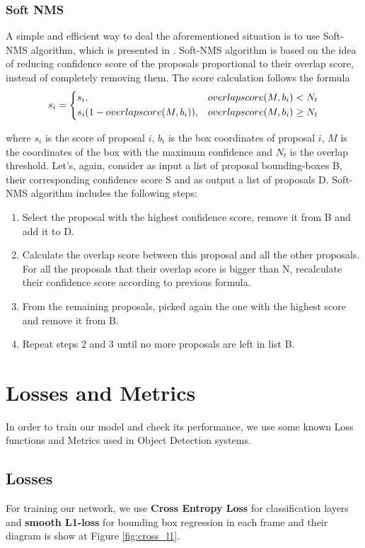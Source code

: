 \subsubsection{Soft NMS}
A simple and efficient way to deal the aforementioned situation is to use Soft-NMS algorithm, which is presented in \cite{DBLP:journals/corr/BodlaSCD17}.
Soft-NMS algorithm is based on the idea of
reducing confidence score of the proposals proportional to their overlap score, instead of completely removing them.
The score calculation follows the formula 
\[ s_i = \begin{dcases}
    s_i, & overlapscore(M, b_i) < N_t \\
    s_i(1-overlapscore(M, b_i)), & overlapscore(M, b_i) \ge N_t
    \end{dcases}
    \]

    where $s_i$ is the score of proposal $i$, $b_i$ is the box coordinates of proposal $i$, $M$ is the coordinates of
    the box with the maximum confidence and $N_t$ is the overlap threshold. Let's, again, consider as input a list of
    proposal bounding-boxes B, their corresponding confidence score S and as output a list of proposals D. Soft-NMS algorithm includes the following steps:

\begin{enumerate}
  
\item Select the proposal with the highest confidence score, remove it from B and add it to D.
\item Calculate the overlap score between this proposal and all the other proposals. For all the proposals that their overlap
  score is bigger than N, recalculate their confidence score according to previous formula.
\item From the remaining proposals, picked again the one with the highest score and remove it from B.
\item Repeat steps 2 and 3 until no more proposals are left in list B.
\end{enumerate}
    
    
\section{Losses and Metrics}
In order to train our model and check its performance, we use some known Loss functions and Metrics used in Object Detection systems.
\subsection{Losses}
For training our network, we use \textbf{Cross Entropy Loss} for classification layers and \textbf{smooth L1-loss} for bounding box regression
in each frame and their diagram is show at Figure \ref{fig:cross_l1}.

